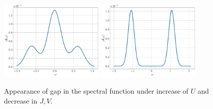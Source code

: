\documentclass[twoside]{report}
\numberwithin{equation}{section}
\begin{document}
\begin{figure}[htpb]
	\centering
	\includegraphics[width=0.45\textwidth]{../figures/metal3.pdf}
	\hspace{\fill}
	\includegraphics[width=0.45\textwidth]{../figures/ins3.pdf}
	\caption{Appearance of gap in the spectral function under increase of \(U\) and decrease in \(J,V\).}
	\label{gap_A}
\end{figure}
\end{document}
